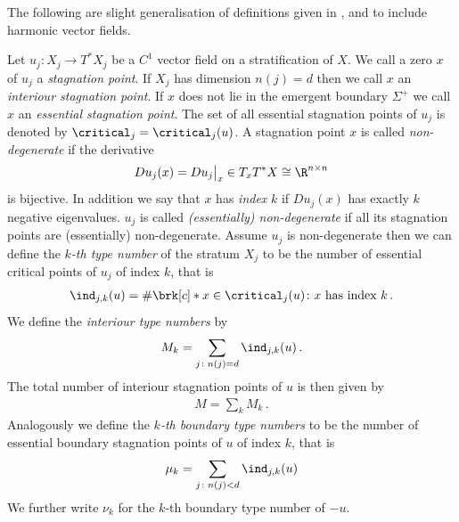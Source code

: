 The following are slight generalisation of definitions given in \cite[p.138f]{Shelton1980}, \cite[§5]{Morse1969} and \cite[p.282f]{Morse1970}
to include harmonic vector fields.
\begin{definition}\label{df:nonDegeneracy}
  Let $u_j\colon X_j\to T^*X_j$ be a $C^1$ vector field on a stratification of $X$.
  We call a zero $x$ of $u_j$ a \emph{stagnation point}.
  If $X_j$ has dimension $n(j)=d$ then we call $x$ an \emph{interiour stagnation point}.
  If $x$ does not lie in the emergent boundary $\Sigma^+$ we call $x$ an \emph{essential stagnation point}.
  The set of all essential stagnation points of $u_j$ is denoted by $\critical_j=\critical_j(u)$.
  A stagnation point $x$ is called
  \emph{non-degenerate} if the derivative
  \begin{align*}
    Du_j(x)=Du_j\big\vert_x\in T_xT^*X\cong \R^{n\times n}
  \end{align*}
  is bijective.
  In addition we say that $x$ has \emph{index} $k$
  if $Du_j(x)$ has exactly $k$ negative eigenvalues.
  $u_j$ is called \emph{(essentially) non-degenerate} if all its stagnation points
  are (essentially) non-degenerate. 
  Assume $u_j$ is non-degenerate then we can define the \emph{$k$-th type number} of the
  stratum $X_j$ to be the number of essential critical points of $u_j$ of index $k$,
  that is
  \begin{align*}
    \ind_{j,k}(u)=\#\brk[c]*{x\in\critical_j(u)\colon x\text{ has index }k}\,.
  \end{align*}
  We define the \emph{interiour type numbers} by
  \begin{align*}
    M_k=\sum_{j\colon n(j)=d}\ind_{j,k}(u)\,.
  \end{align*}
  The total number of interiour
  stagnation points of $u$ is then given by
  \begin{align*}
    M=\sum_kM_k\,.
  \end{align*}
  Analogously we define the \emph{$k$-th boundary type numbers} to be the number of essential boundary 
  stagnation points of $u$ of index $k$, that is
  \begin{align*}
    \mu_k=\sum_{j\colon n(j)<d}\ind_{j,k}(u)
  \end{align*}
  We further write $\nu_k$ for the $k$-th boundary type number of $-u$.
\end{definition}

